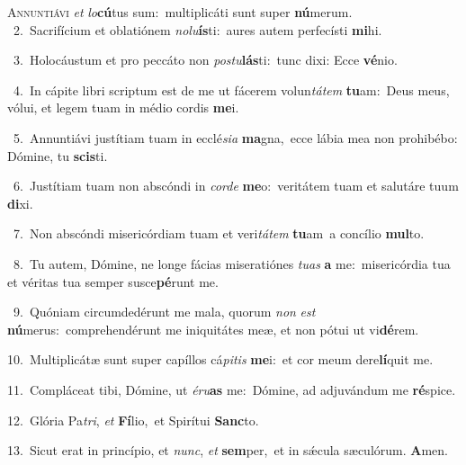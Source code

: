 \lettrine{\initial\textcolor{\initialcolor}{A}}{nnuntiávi} \textit{et} \textit{lo}\-\textbf{cú}tus sum:~\star multiplicáti sunt super \textbf{nú}\-merum.\\
{\numbfont\textcolor{\numbcolor}{~2.}}~Sacrifícium et oblatiónem \textit{no}\-\textit{lu}\textbf{ís}ti:~\star aures autem perfecísti \textbf{mi}\-hi.\par
{\numbfont\textcolor{\numbcolor}{~3.}}~Holocáustum et pro peccáto non \textit{pos}\-\textit{tu}\textbf{lás}ti:~\star tunc dixi: Ecce \textbf{vé}\-nio.\par
{\numbfont\textcolor{\numbcolor}{~4.}}~In cápite libri scriptum est de me ut fácerem volun\-\textit{tá}\-\textit{tem} \textbf{tu}\-am:~\star Deus meus, vólui, et legem tuam in médio cordis \textbf{me}\-i.\par
{\numbfont\textcolor{\numbcolor}{~5.}}~Annuntiávi justítiam tuam in ecclé\-\textit{si}\-\textit{a} \textbf{ma}\-gna,~\star ecce lábia mea non prohibébo: Dómine, tu \textbf{scis}\-ti.\par
{\numbfont\textcolor{\numbcolor}{~6.}}~Justítiam tuam non abscóndi in \textit{cor}\-\textit{de} \textbf{me}\-o:~\star veritátem tuam et salutáre tuum \textbf{di}\-xi.\par
{\numbfont\textcolor{\numbcolor}{~7.}}~Non abscóndi misericórdiam tuam et veri\-\textit{tá}\-\textit{tem} \textbf{tu}\-am~\star a concílio \textbf{mul}\-to.\par
{\numbfont\textcolor{\numbcolor}{~8.}}~Tu autem, Dómine, ne longe fácias miseratiónes \textit{tu}\-\textit{as} \textbf{a} me:~\star misericórdia tua et véritas tua semper susce\-\textbf{pé}\-runt me.\par
{\numbfont\textcolor{\numbcolor}{~9.}}~Quóniam circumdedérunt me mala, quorum \textit{non} \textit{est} \textbf{nú}\-merus:~\star comprehendérunt me iniquitátes meæ, et non pótui ut vi\-\textbf{dé}\-rem.\par
{\numbfont\textcolor{\numbcolor}{10.}}~Multiplicátæ sunt super capíllos cá\-\textit{pi}\-\textit{tis} \textbf{me}\-i:~\star et cor meum dere\-\textbf{lí}\-quit me.\par
{\numbfont\textcolor{\numbcolor}{11.}}~Compláceat tibi, Dómine, ut \textit{é}\-\textit{ru}\textbf{as} me:~\star Dómine, ad adjuvándum me \textbf{ré}\-spice.\par
{\numbfont\textcolor{\numbcolor}{12.}}~Glória Pa\-\textit{tri}\-, \textit{et} \textbf{Fí}\-lio,~\star et Spirítui \textbf{Sanc}\-to.\par
{\numbfont\textcolor{\numbcolor}{13.}}~Sicut erat in princípio, et \textit{nunc}\-, \textit{et} \textbf{sem}\-per,~\star et in sǽcula sæculórum. \textbf{A}\-men.\par
